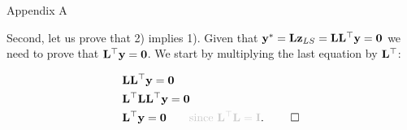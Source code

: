 \documentclass{beamer}
\begin{document}
\begin{frame}{Appendix A}
	\begin{flushleft}
		
		
		Second, let us prove that 2) implies 1). Given that $\mathbf{y}^* = \mathbf{L}\mathbf{z}_{LS} = \mathbf{L}\mathbf{L}^\top \mathbf{y} = \mathbf{0}$ we need to prove that $\mathbf{L}^\top \mathbf{y} = \mathbf{0}$. We start by multiplying the last equation by $\mathbf{L}^\top$:
		
		\begin{align}
			& \bo{L}\bo{L}\T \bo{y} = \bo{0} \\
			& \bo{L}\T \bo{L}\bo{L}\T \bo{y} = \bo{0} \\
			& \bo{L}\T \bo{y} = \bo{0}  \ \ \ \ \ \ \textcolor{mygray}{\text{since }  \bo{L}\T \bo{L} = \bo{I}}. \ \qed
		\end{align}		
		
	\end{flushleft}
\end{frame}
\end{document}
